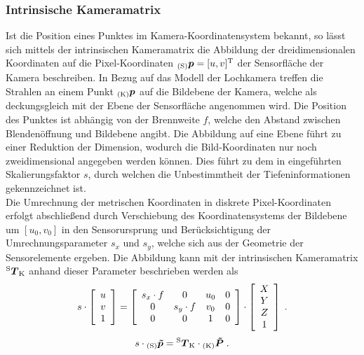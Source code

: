 \subsubsection{Intrinsische Kameramatrix}
Ist die Position eines Punktes im Kamera-Koordinatensystem bekannt, so lässt sich mittels der intrinsischen Kameramatrix die Abbildung der dreidimensionalen Koordinaten auf die Pixel-Koordinaten ${_{{\mathrm{(S)}}}}\mbox{\boldmath{$p$}} = [u,v]^{\mathrm{T}}$ der Sensorfläche der Kamera beschreiben. In Bezug auf das Modell der Lochkamera treffen die Strahlen an einem Punkt ${_{{\mathrm{(K)}}}}\mbox{\boldmath{${p}$}}$ auf die Bildebene der Kamera, welche als deckungsgleich mit der Ebene der Sensorfläche angenommen wird. Die Position des Punktes ist abhängig von der Brennweite $f$, welche den Abstand zwischen Blendenöffnung und Bildebene angibt. Die Abbildung auf eine Ebene führt zu einer Reduktion der Dimension, wodurch die Bild-Koordinaten nur noch zweidimensional angegeben werden können. Dies führt zu dem in  eingeführten Skalierungsfaktor $s$, durch welchen die Unbestimmtheit der Tiefeninformationen gekennzeichnet ist.\\
Die Umrechnung der metrischen Koordinaten in diskrete Pixel-Koordinaten erfolgt abschließend durch Verschiebung des Koordinatensystems der Bildebene um $[u_0,v_0]$ in den Sensorursprung und Berücksichtigung der Umrechnungsparameter $s_x$ und $s_y$, welche sich aus der Geometrie der Sensorelemente ergeben. Die Abbildung kann mit der intrinsischen Kameramatrix ${^{\mathrm{S}}\mbox{\boldmath{$T$}}_{\mathrm{K}}}$ anhand dieser Parameter beschrieben werden als
%
%
%
\begin{equation}
s \cdot 
\mat{c}{
u\\
v\\
1
}
= 
\mat{cccc}{
s_x \cdot f & 0 & u_\ind{0} & 0\\
0 & s_y \cdot f & v_\ind{0} & 0\\
0 & 0 & 1 & 0
}
 \cdot
\mat{c}{
X\\
Y\\
Z\\
1
} \; \text{.}
\label{eq.intrinsic}
\end{equation}%
\begin{equation}
s \cdot {_{{\mathrm{(S)}}}}\mbox{\boldmath{$\tilde{p}$}} = {^{\mathrm{S}}\mbox{\boldmath{$T$}}_{\mathrm{K}}} \cdot {_{{\mathrm{(K)}}}}\mbox{\boldmath{$\tilde{P}$}} \; \text{.}
\end{equation}

